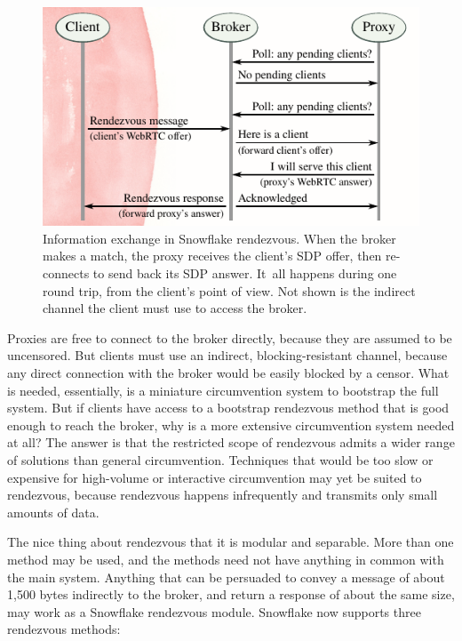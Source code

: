 \documentclass[letterpaper,twocolumn]{article}
\begin{document}
\begin{figure}
\includegraphics{figures/rendezvous/rendezvous}
\caption{
Information exchange in Snowflake rendezvous.
When the broker makes a match,
the proxy receives the client's SDP offer,
then re-connects to send back its SDP answer.
It~all happens during one round trip,
from the client's point of view.
Not shown is the indirect channel
the client must use to access the broker.
}
\label{fig:rendezvous}
\end{figure}

Proxies are free to connect to the broker directly,
because they are assumed to be uncensored.
But clients must use an indirect,
blocking-resistant channel,
because any direct connection with the broker
would be easily blocked by a censor.
What is needed, essentially,
is a miniature circumvention system to
bootstrap the full system.
But if clients have access to a bootstrap rendezvous method
that is good enough to reach the broker,
why is a more extensive circumvention system needed at all?
The answer is that the restricted scope of rendezvous
admits a wider range of solutions than general circumvention.
Techniques that would be too slow or expensive
for high-volume or interactive circumvention
may yet be suited to rendezvous,
because rendezvous happens infrequently
and transmits only small amounts of data.

The nice thing about rendezvous that it is modular and separable.
More than one method may be used,
and the methods need not have anything in common with the main system.
Anything that can be persuaded to convey a message
of about 1,500 bytes indirectly to the broker,
and return a response of about the same size,
may work as a Snowflake rendezvous module.
Snowflake now supports three rendezvous methods:
\end{document}
